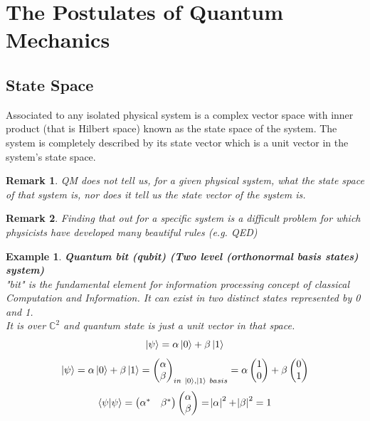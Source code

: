 \documentclass[]{book}
\newtheorem*{remark}{Remark}
\newtheorem*{example}{Example}
\theoremstyle{nonumberplain}
\begin{document}
\section{The Postulates of Quantum Mechanics}
\subsection{State Space}
\begin{postu}[1]
	Associated to any isolated physical system is a complex vector space with inner product (that is Hilbert space) known as the state space of the system. The system is completely described by its state vector which is a unit vector in the system's state space.
\end{postu}
\begin{remark}
QM does not tell us, for a given physical system, what the state space of that system is, nor does it tell us the state vector of the system is.
\end{remark}
\begin{remark}
	Finding that out for a specific system is a difficult problem for which physicists have developed many beautiful rules (e.g. QED)
\end{remark}
\begin{example} 
	\textbf{Quantum bit (qubit) (Two level (orthonormal basis states) system)}\\
"bit" is the fundamental element for information processing concept of classical Computation and Information. It can exist in two distinct states represented by 0 and 1.\\
It is over $\mathbb{C}^{2}$ and quantum state is just a unit vector in that space.
\[
\ket{\psi}=\alpha\ket{0}+\beta\ket{1}
\] 
\[
\ket{\psi} = \alpha\ket{0}+\beta\ket{1} = 
\begin{pmatrix}
\alpha \\
\beta
\end{pmatrix}_{in\  \ket{0}, \ket{1}\ basis}
= \alpha
\begin{pmatrix}
1\\
0
\end{pmatrix}
+ \beta
\begin{pmatrix}
0\\
1
\end{pmatrix}
\] 
\[
	\braket{\psi|\psi} = 
\begin{pmatrix}
	\alpha^{*} & \beta^{*}
\end{pmatrix}
\begin{pmatrix}
	\alpha\\ \beta
\end{pmatrix}
= \abs{\alpha}^{2}+\abs{\beta}^{2}=1
\] 
\end{example}
\end{document}
